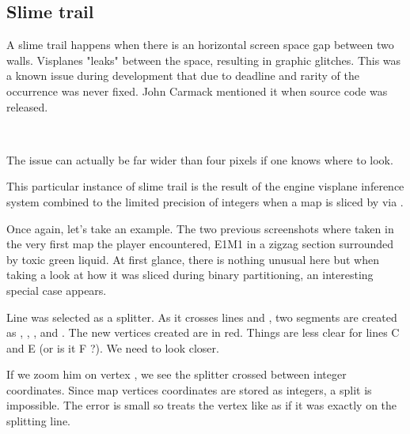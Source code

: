 \subsection{Slime trail}
A slime trail happens when there is an horizontal screen space gap between two walls. Visplanes "leaks" between the space, resulting in graphic glitches. This was a known issue during development that due to deadline and rarity of the occurrence was never fixed. John Carmack mentioned it when  source code was released.\\
\par
{}\\
\par



The issue can actually be far wider than four pixels if one knows where to look.\\
\par
{}
\par
This particular instance of slime trail is the result of the engine visplane inference system combined to the limited precision of integers when a map is sliced by via .\\
\par
 Once again, let's take an example. The two previous screenshots where taken in the very first map the player encountered, E1M1 in a zigzag section surrounded by toxic green liquid. At first glance, there is nothing unusual here but when taking a look at how it was sliced during binary partitioning, an interesting special case appears.\\
\par
Line  was selected as a splitter. As it crosses lines  and , two segments are created as , , , and . The new vertices created are in red. Things are less clear for lines C and E (or is it F ?). We need to look closer. \\
\par
If we zoom him on vertex , we see the splitter crossed  between integer coordinates. Since map vertices coordinates are stored as integers, a split is impossible. The error is small so  treats the vertex like as if it was exactly on the splitting line.

